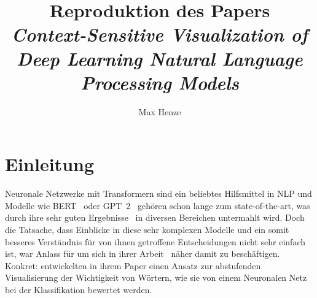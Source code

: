 \documentclass[DIV=13,fontsize=11pt]{scrartcl}
\begin{document}
\subject{Projektbericht zum Modul Data Mining Wintersemester 20221/2022}
\title{Reproduktion des Papers \\ \textit{Context-Sensitive Visualization of Deep Learning Natural Language Processing Models}\cite{dunn2021context}}
\author{Max Henze}%
\maketitle%

\section{Einleitung}


Neuronale Netzwerke mit Transformern sind ein beliebtes Hilfsmittel in NLP und
Modelle wie BERT~\cite{devlin2018bert} oder GPT~2~\cite{radford2019language} gehören schon lange zum state-of-the-art, was durch ihre sehr guten
Ergebnisse~\cite{minaee2021deep,liu2019text,sun2019utilizing} in diversen Bereichen untermahlt wird.
Doch die Tatsache, dass Einblicke in diese sehr komplexen Modelle und ein somit besseres Verständnis für von ihnen getroffene Entscheidungen
nicht sehr einfach ist, war Anlass für \citeauthor{dunn2021context} um sich in ihrer Arbeit~\cite{dunn2021context} näher damit
zu beschäftigen. Konkret: \citeauthor{dunn2021context} entwickelten in ihrem Paper einen Ansatz zur abstufenden Visualisierung der Wichtigkeit
von Wörtern, wie sie von einem Neuronalen Netz bei der Klassifikation bewertet werden.
\end{document}
